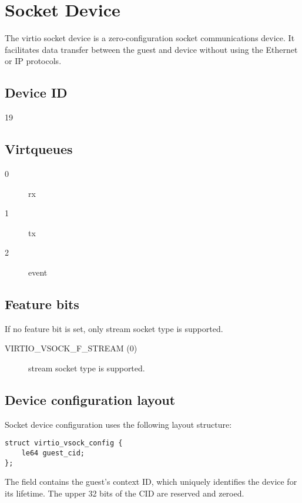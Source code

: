 \section{Socket Device}\label{sec:Device Types / Socket Device}

The virtio socket device is a zero-configuration socket communications device.
It facilitates data transfer between the guest and device without using the
Ethernet or IP protocols.

\subsection{Device ID}\label{sec:Device Types / Socket Device / Device ID}
  19

\subsection{Virtqueues}\label{sec:Device Types / Socket Device / Virtqueues}
\begin{description}
\item[0] rx
\item[1] tx
\item[2] event
\end{description}

\subsection{Feature bits}\label{sec:Device Types / Socket Device / Feature bits}

If no feature bit is set, only stream socket type is supported.

\begin{description}
\item[VIRTIO_VSOCK_F_STREAM (0)] stream socket type is supported.
\end{description}

\subsection{Device configuration layout}\label{sec:Device Types / Socket Device / Device configuration layout}

Socket device configuration uses the following layout structure:

\begin{lstlisting}
struct virtio_vsock_config {
	le64 guest_cid;
};
\end{lstlisting}

The  field contains the guest's context ID, which uniquely
identifies the device for its lifetime.  The upper 32 bits of the CID are
reserved and zeroed.

